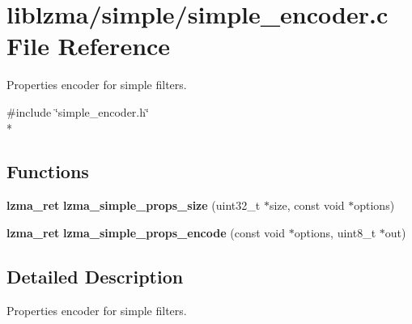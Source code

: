 \section{liblzma/simple/simple\-\_\-encoder.c File Reference}
\label{simple__encoder_8c}


Properties encoder for simple filters.  


{\ttfamily \#include \char`\"{}simple\-\_\-encoder.\-h\char`\"{}}\\*
\subsection*{Functions}
\begin{DoxyCompactItemize}
\item 
{\bf lzma\-\_\-ret} {\bfseries lzma\-\_\-simple\-\_\-props\-\_\-size} (uint32\-\_\-t $\ast$size, const void $\ast$options)\label{simple__encoder_8c_ae38a631eb233ba04674f36ec11884089}

\item 
{\bf lzma\-\_\-ret} {\bfseries lzma\-\_\-simple\-\_\-props\-\_\-encode} (const void $\ast$options, uint8\-\_\-t $\ast$out)\label{simple__encoder_8c_ad3c030fa9638c5f043c3e1d20de380ac}

\end{DoxyCompactItemize}


\subsection{Detailed Description}
Properties encoder for simple filters. 